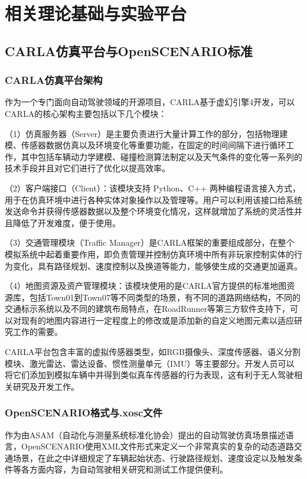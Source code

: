 \chapter{相关理论基础与实验平台}
\section{CARLA仿真平台与OpenSCENARIO标准}
\subsection{CARLA仿真平台架构}
作为一个专门面向自动驾驶领域的开源项目，CARLA基于虚幻引擎4开发，可以CARLA的核心架构主要包括以下几个模块：

（1）仿真服务器（Server）是主要负责进行大量计算工作的部分，包括物理建模、传感器数据仿真以及环境变化等重要功能，在固定的时间间隔下进行循环工作，其中包括车辆动力学建模、碰撞检测算法制定以及天气条件的变化等一系列的技术手段并且对它们进行了优化以提高效率。

（2）客户端接口（Client）：该模块支持 Python、C++ 两种编程语言接入方式，用于在仿真环境中进行各种实体对象操作以及管理等。用户可以利用该接口给系统发送命令并获得传感器数据以及整个环境变化情况，这样就增加了系统的灵活性并且降低了开发难度，便于使用。

（3）交通管理模块（Traffic Manager）是CARLA框架的重要组成部分，在整个模拟系统中起着重要作用，即负责管理并控制仿真环境中所有非玩家控制实体的行为变化，具有路径规划、速度控制以及换道等能力，能够使生成的交通更加逼真。

（4）地图资源及资产管理模块：该模块使用的是CARLA官方提供的标准地图资源库，包括Town01到Town07等不同类型的场景，有不同的道路网络结构，不同的交通标示系统以及不同的建筑布局特点，在RoadRunner等第三方软件支持下，可以对现有的地图内容进行一定程度上的修改或是添加新的自定义地图元素以适应研究工作的需要。

CARLA平台包含丰富的虚拟传感器类型，如RGB摄像头、深度传感器、语义分割模块、激光雷达、雷达设备、惯性测量单元（IMU）等主要部分。开发人员可以将它们添加到模拟车辆中并得到类似真车传感器的行为表现，这有利于无人驾驶相关研究及开发工作。

\subsection{OpenSCENARIO格式与.xosc文件}
作为由ASAM（自动化与测量系统标准化协会）提出的自动驾驶仿真场景描述语言，OpenSCENARIO使用XML文件形式来定义一个非常真实的复杂的动态道路交通场景，在此之中详细规定了车辆起始状态、行驶路径规划、速度设定以及触发条件等各方面内容，为自动驾驶相关研究和测试工作提供便利\cite{yu2021openscenario}。

